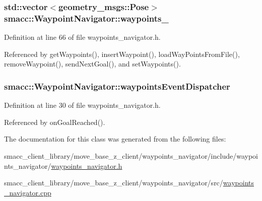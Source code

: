 \subsubsection[{\texorpdfstring{waypoints\+\_\+}{waypoints_}}]{\setlength{\rightskip}{0pt plus 5cm}std\+::vector$<$geometry\+\_\+msgs\+::\+Pose$>$ smacc\+::\+Waypoint\+Navigator\+::waypoints\+\_\+\hspace{0.3cm}{\ttfamily [private]}}\hypertarget{classsmacc_1_1WaypointNavigator_a59d691f2177430c407b8e27df07552e9}{}\label{classsmacc_1_1WaypointNavigator_a59d691f2177430c407b8e27df07552e9}


Definition at line 66 of file waypoints\+\_\+navigator.\+h.



Referenced by get\+Waypoints(), insert\+Waypoint(), load\+Way\+Points\+From\+File(), remove\+Waypoint(), send\+Next\+Goal(), and set\+Waypoints().

\subsubsection[{\texorpdfstring{waypoints\+Event\+Dispatcher}{waypointsEventDispatcher}}]{ smacc\+::\+Waypoint\+Navigator\+::waypoints\+Event\+Dispatcher}\hypertarget{classsmacc_1_1WaypointNavigator_aab7ff616b0eba7a5ad5f03113f2de8fd}{}\label{classsmacc_1_1WaypointNavigator_aab7ff616b0eba7a5ad5f03113f2de8fd}


Definition at line 30 of file waypoints\+\_\+navigator.\+h.



Referenced by on\+Goal\+Reached().



The documentation for this class was generated from the following files\+:\begin{DoxyCompactItemize}
\item 
smacc\+\_\+client\+\_\+library/move\+\_\+base\+\_\+z\+\_\+client/waypoints\+\_\+navigator/include/waypoints\+\_\+navigator/\hyperlink{waypoints__navigator_8h}{waypoints\+\_\+navigator.\+h}\item 
smacc\+\_\+client\+\_\+library/move\+\_\+base\+\_\+z\+\_\+client/waypoints\+\_\+navigator/src/\hyperlink{waypoints__navigator_8cpp}{waypoints\+\_\+navigator.\+cpp}\end{DoxyCompactItemize}
